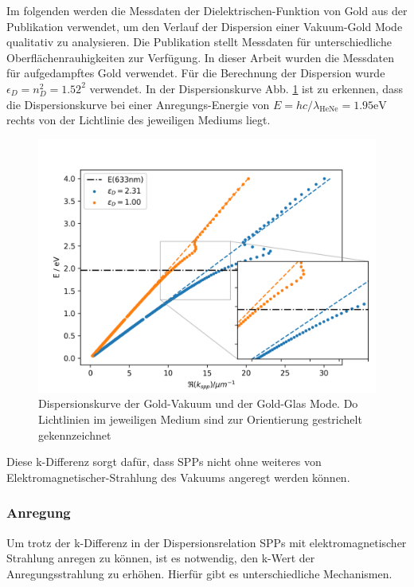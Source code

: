 \documentclass{article}
\begin{document}
	Im folgenden werden die Messdaten der Dielektrischen-Funktion von Gold aus der Publikation \cite{Olmon.2012} verwendet, um den Verlauf der Dispersion einer Vakuum-Gold Mode qualitativ zu analysieren.  Die Publikation stellt Messdaten für unterschiedliche Oberflächenrauhigkeiten zur Verfügung. In dieser Arbeit wurden die Messdaten für aufgedampftes Gold verwendet. Für die Berechnung der Dispersion wurde $\epsilon_D = n_D^2 = 1.52^2$ verwendet. In der Dispersionskurve Abb. \ref{fig:dispersion_spp} ist zu erkennen, dass die Dispersionskurve bei einer Anregungs-Energie von $E = hc/\lambda_{\mathrm{HeNe}}= 1.95\mathrm{eV}$ rechts von der Lichtlinie des jeweiligen Mediums liegt.
	\begin{figure}[h]
		\label{fig:dispersion_spp}
		\centering
		\includegraphics[width=1\textwidth]{figures/dispersion.png}
		\caption{Dispersionskurve der Gold-Vakuum und der Gold-Glas Mode. Do Lichtlinien im jeweiligen Medium sind zur Orientierung gestrichelt gekennzeichnet}		
	\end{figure}
	Diese k-Differenz sorgt dafür, dass SPPs nicht ohne weiteres von Elektromagnetischer-Strahlung des Vakuums angeregt werden können.	
		\subsubsection{Anregung}
			Um trotz der k-Differenz in der Dispersionsrelation SPPs mit elektromagnetischer Strahlung anregen zu können, ist es notwendig, den k-Wert der Anregungsstrahlung zu erhöhen. Hierfür gibt es unterschiedliche Mechanismen.
\end{document}
